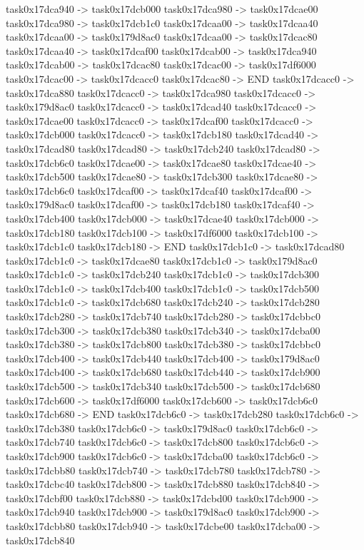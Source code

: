 {	task0x17dca940 -> task0x17dcb000
	task0x17dca980 -> task0x17dcae00
	task0x17dca980 -> task0x17dcb1c0
	task0x17dcaa00 -> task0x17dcaa40
	task0x17dcaa00 -> task0x179d8ac0
	task0x17dcaa00 -> task0x17dcac80
	task0x17dcaa40 -> task0x17dcaf00
	task0x17dcab00 -> task0x17dca940
	task0x17dcab00 -> task0x17dcac80
	task0x17dcac00 -> task0x17df6000
	task0x17dcac00 -> task0x17dcacc0
	task0x17dcac80 -> END
	task0x17dcacc0 -> task0x17dca880
	task0x17dcacc0 -> task0x17dca980
	task0x17dcacc0 -> task0x179d8ac0
	task0x17dcacc0 -> task0x17dcad40
	task0x17dcacc0 -> task0x17dcae00
	task0x17dcacc0 -> task0x17dcaf00
	task0x17dcacc0 -> task0x17dcb000
	task0x17dcacc0 -> task0x17dcb180
	task0x17dcad40 -> task0x17dcad80
	task0x17dcad80 -> task0x17dcb240
	task0x17dcad80 -> task0x17dcb6c0
	task0x17dcae00 -> task0x17dcae80
	task0x17dcae40 -> task0x17dcb500
	task0x17dcae80 -> task0x17dcb300
	task0x17dcae80 -> task0x17dcb6c0
	task0x17dcaf00 -> task0x17dcaf40
	task0x17dcaf00 -> task0x179d8ac0
	task0x17dcaf00 -> task0x17dcb180
	task0x17dcaf40 -> task0x17dcb400
	task0x17dcb000 -> task0x17dcae40
	task0x17dcb000 -> task0x17dcb180
	task0x17dcb100 -> task0x17df6000
	task0x17dcb100 -> task0x17dcb1c0
	task0x17dcb180 -> END
	task0x17dcb1c0 -> task0x17dcad80
	task0x17dcb1c0 -> task0x17dcae80
	task0x17dcb1c0 -> task0x179d8ac0
	task0x17dcb1c0 -> task0x17dcb240
	task0x17dcb1c0 -> task0x17dcb300
	task0x17dcb1c0 -> task0x17dcb400
	task0x17dcb1c0 -> task0x17dcb500
	task0x17dcb1c0 -> task0x17dcb680
	task0x17dcb240 -> task0x17dcb280
	task0x17dcb280 -> task0x17dcb740
	task0x17dcb280 -> task0x17dcbbc0
	task0x17dcb300 -> task0x17dcb380
	task0x17dcb340 -> task0x17dcba00
	task0x17dcb380 -> task0x17dcb800
	task0x17dcb380 -> task0x17dcbbc0
	task0x17dcb400 -> task0x17dcb440
	task0x17dcb400 -> task0x179d8ac0
	task0x17dcb400 -> task0x17dcb680
	task0x17dcb440 -> task0x17dcb900
	task0x17dcb500 -> task0x17dcb340
	task0x17dcb500 -> task0x17dcb680
	task0x17dcb600 -> task0x17df6000
	task0x17dcb600 -> task0x17dcb6c0
	task0x17dcb680 -> END
	task0x17dcb6c0 -> task0x17dcb280
	task0x17dcb6c0 -> task0x17dcb380
	task0x17dcb6c0 -> task0x179d8ac0
	task0x17dcb6c0 -> task0x17dcb740
	task0x17dcb6c0 -> task0x17dcb800
	task0x17dcb6c0 -> task0x17dcb900
	task0x17dcb6c0 -> task0x17dcba00
	task0x17dcb6c0 -> task0x17dcbb80
	task0x17dcb740 -> task0x17dcb780
	task0x17dcb780 -> task0x17dcbc40
	task0x17dcb800 -> task0x17dcb880
	task0x17dcb840 -> task0x17dcbf00
	task0x17dcb880 -> task0x17dcbd00
	task0x17dcb900 -> task0x17dcb940
	task0x17dcb900 -> task0x179d8ac0
	task0x17dcb900 -> task0x17dcbb80
	task0x17dcb940 -> task0x17dcbe00
	task0x17dcba00 -> task0x17dcb840
}
